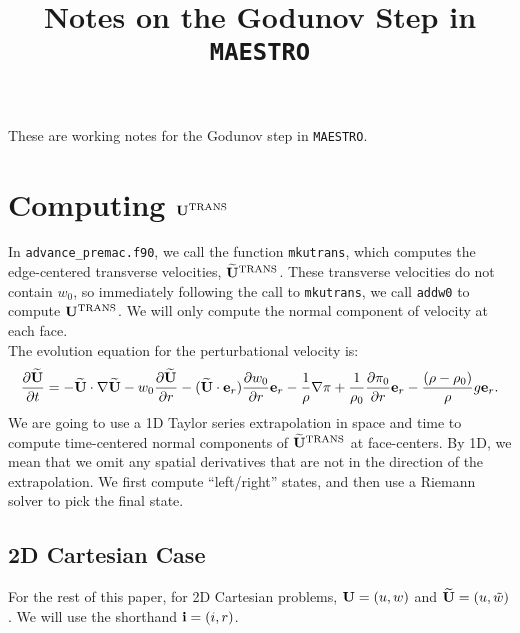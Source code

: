 \documentclass[11pt]{article}
\title{Notes on the Godunov Step in {\tt MAESTRO}}
\def\trans {\rm TRANS}
\def\eb    {{\bf e}}
\def\ib    {{\bf i}}
\def\Ub    {{\bf U}}
\def\Ubt   {\widetilde{\bf U}}
\def\wt    {\tilde{w}}
\begin{document}
\maketitle

These are working notes for the Godunov step in {\tt MAESTRO}.

\section{Computing $\Ub^{\trans}$}
In {\tt advance\_premac.f90}, we call the function {\tt mkutrans}, which computes the edge-centered transverse velocities, $\Ubt^{\trans}$.  These transverse velocities do not contain $w_0$, so immediately following the call to {\tt mkutrans}, we call {\tt addw0} to compute $\Ub^{\trans}$.  We will only compute the normal component of velocity at each face.\\

The evolution equation for the perturbational velocity is:
\begin{equation}
\frac{\partial\Ubt}{\partial t} = -\Ubt\cdot\nabla\Ubt - w_0\frac{\partial\Ubt}{\partial r} - (\Ubt\cdot\eb_r)\frac{\partial w_0}{\partial r}\eb_r - \frac{1}{\rho}\nabla\pi + \frac{1}{\rho_0}\frac{\partial\pi_0}{\partial r}\eb_r - \frac{(\rho-\rho_0)}{\rho}g\eb_r.\label{Perturbational Velocity Equation}
\end{equation}
We are going to use a 1D Taylor series extrapolation in space and time to compute time-centered normal components of $\Ubt^{\trans}$ at face-centers.  By 1D, we mean that we omit any spatial derivatives that are not in the direction of the extrapolation.  We first compute ``left/right'' states, and then use a Riemann solver to pick the final state.\\
\subsection{2D Cartesian Case}
For the rest of this paper, for 2D Cartesian problems, $\Ub = (u,w)$ and $\Ubt = (u,\wt)$.  We will use the shorthand $\ib = (i,r)$.\\
\end{document}
